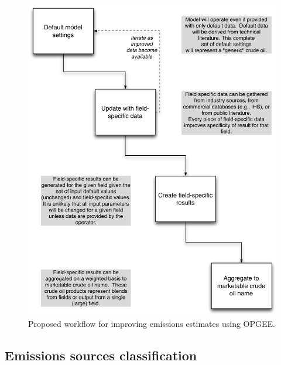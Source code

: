 \documentclass[11pt]{report}
\begin{document}
\begin{figure}[t]
\includegraphics[width=0.8\columnwidth]{images/Flow_chart.pdf}
\caption{Proposed workflow for improving emissions estimates using OPGEE.}
\label{fig:OPGEE_flow}
\end{figure}




\subsection{Emissions sources classification}
\end{document}
